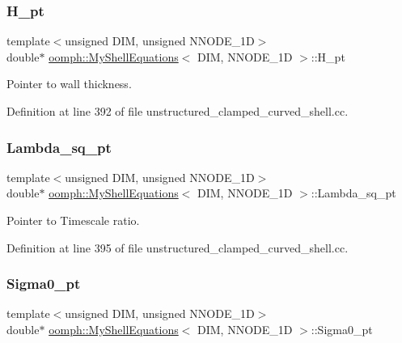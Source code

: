 \subsubsection{\texorpdfstring{H\+\_\+pt}{H\_pt}}
{\footnotesize\ttfamily template$<$unsigned D\+IM, unsigned N\+N\+O\+D\+E\+\_\+1D$>$ \\
double$\ast$ \hyperlink{classoomph_1_1MyShellEquations}{oomph\+::\+My\+Shell\+Equations}$<$ D\+IM, N\+N\+O\+D\+E\+\_\+1D $>$\+::H\+\_\+pt\hspace{0.3cm}{\ttfamily [protected]}}



Pointer to wall thickness. 



Definition at line 392 of file unstructured\+\_\+clamped\+\_\+curved\+\_\+shell.\+cc.

\mbox{\label{classoomph_1_1MyShellEquations_a6201b3eced8396c6e2246df94c946537}} 
\subsubsection{\texorpdfstring{Lambda\+\_\+sq\+\_\+pt}{Lambda\_sq\_pt}}
{\footnotesize\ttfamily template$<$unsigned D\+IM, unsigned N\+N\+O\+D\+E\+\_\+1D$>$ \\
double$\ast$ \hyperlink{classoomph_1_1MyShellEquations}{oomph\+::\+My\+Shell\+Equations}$<$ D\+IM, N\+N\+O\+D\+E\+\_\+1D $>$\+::Lambda\+\_\+sq\+\_\+pt\hspace{0.3cm}{\ttfamily [protected]}}



Pointer to Timescale ratio. 



Definition at line 395 of file unstructured\+\_\+clamped\+\_\+curved\+\_\+shell.\+cc.

\mbox{\label{classoomph_1_1MyShellEquations_a909b1e9608109048d446f86ca3c7d02d}} 
\subsubsection{\texorpdfstring{Sigma0\+\_\+pt}{Sigma0\_pt}}
{\footnotesize\ttfamily template$<$unsigned D\+IM, unsigned N\+N\+O\+D\+E\+\_\+1D$>$ \\
double$\ast$ \hyperlink{classoomph_1_1MyShellEquations}{oomph\+::\+My\+Shell\+Equations}$<$ D\+IM, N\+N\+O\+D\+E\+\_\+1D $>$\+::Sigma0\+\_\+pt\hspace{0.3cm}{\ttfamily [protected]}}




